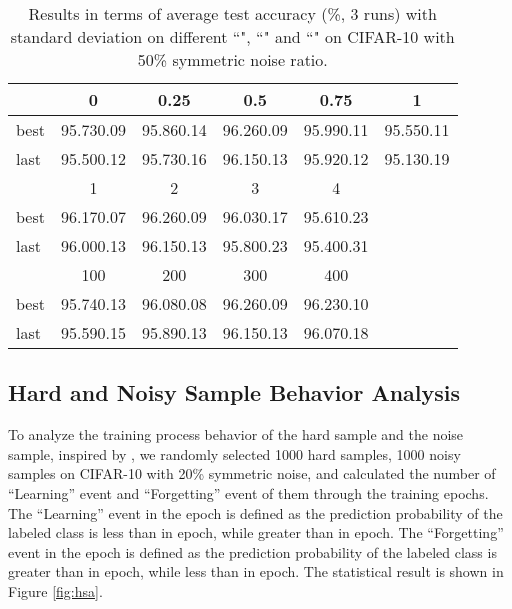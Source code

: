 \documentclass[letterpaper]{article} \usepackage{aaai22}  \usepackage{times}  \usepackage{helvet}  \usepackage{courier}  \usepackage[hyphens]{url}  \usepackage{graphicx} \urlstyle{rm} \def\UrlFont{\rm}  \usepackage{natbib}  \usepackage{caption} \DeclareCaptionStyle{ruled}{labelfont=normalfont,labelsep=colon,strut=off} \frenchspacing  \setlength{\pdfpagewidth}{8.5in}  \setlength{\pdfpageheight}{11in}  \usepackage{algorithm}
\begin{document}
\begin{table}[H]
\caption{Results in terms of average test accuracy (\%, 3 runs) with standard deviation on different ``", ``" and ``" on CIFAR-10 with 50\% symmetric noise ratio.}
\vskip 0.15in
\scriptsize
\centering
\begin{tabular}{@{}l|ccccc@{}}
\toprule
    & 0           & 0.25                 & 0.5                  & 0.75        & 1           \\ \midrule
best & 95.730.09 & 95.860.14          & {96.260.09} & 95.990.11 & 95.550.11 \\
last & 95.500.12 & 95.730.16          & {96.150.13} & 95.920.12 & 95.130.19 \\ \midrule
    & 1           & 2                    & 3                    & 4           &             \\ \midrule
best & 96.170.07 & {96.260.09} & 96.030.17          & 95.610.23 &             \\
last & 96.000.13 & {96.150.13} & 95.800.23          & 95.400.31 &             \\ \midrule
    & 100         & 200                  & 300                  & 400         &             \\ \midrule
best & 95.740.13 & 96.080.08          & {96.260.09} & 96.230.10 &             \\
last & 95.590.15 & 95.890.13          & {96.150.13} & 96.070.18 &             \\ \bottomrule
\end{tabular}
\label{exp:parA}
\vskip -0.1in
\end{table}


\subsection{Hard and Noisy Sample Behavior Analysis}
To analyze the training process behavior of the hard sample and the noise sample, inspired by \cite{toneva2018empirical}, we randomly selected 1000 hard samples, 1000 noisy samples on CIFAR-10 with 20\% symmetric noise, and calculated the number of ``Learning'' event and ``Forgetting'' event of them through the training epochs. The ``Learning'' event in the  epoch is defined as the prediction probability of the labeled class is less than  in  epoch, while greater than  in  epoch. The ``Forgetting'' event in the  epoch is defined as the prediction probability of the labeled class is greater than  in  epoch, while less than  in  epoch. The statistical result is shown in Figure \ref{fig:hsa}. 
\end{document}
